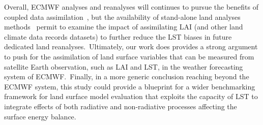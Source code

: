 \documentclass[gmd, manuscript]{copernicus}
\begin{document}
{Overall, ECMWF analyses and reanalyses will continues to pursue the
benefits of coupled data assimilation~\citep{de_Rosnay_2022}, but the
availability of stand-alone land analyses methods~\citep{Fairbairn_2019}
permit to examine the impact of assimilating LAI (and other land climate
data records datasets) to further reduce the LST biases in future
dedicated land reanalyses.~Ultimately, our work does provides a strong
argument to push for the assimilation of land surface variables that can
be measured from satellite Earth observation, such as LAI and LST, in
the weather forecasting system of ECMWF.~Finally, in a more generic
conclusion reaching beyond the ECMWF system, this study could provide a
blueprint for a wider benchmarking framework for land surface model
evaluation that exploits the capacity of LST to integrate effects of
both radiative and non-radiative processes affecting the surface energy
balance.












}
\end{document}
